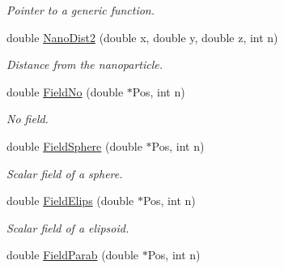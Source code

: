 \begin{DoxyCompactItemize}
\begin{DoxyCompactList}\small\item\em \-Pointer to a generic function. \end{DoxyCompactList}\item 
\hypertarget{classVarData_aa61f01d24c76e8a70a3efe30ea22176b}{double \hyperlink{classVarData_aa61f01d24c76e8a70a3efe30ea22176b}{\-Nano\-Dist2} (double x, double y, double z, int n)}\label{classVarData_aa61f01d24c76e8a70a3efe30ea22176b}

\begin{DoxyCompactList}\small\item\em \-Distance from the nanoparticle. \end{DoxyCompactList}\item 
\hypertarget{classVarData_a735d13f805f242e68213f0fc5e93c1b6}{double \hyperlink{classVarData_a735d13f805f242e68213f0fc5e93c1b6}{\-Field\-No} (double $\ast$\-Pos, int n)}\label{classVarData_a735d13f805f242e68213f0fc5e93c1b6}

\begin{DoxyCompactList}\small\item\em \-No field. \end{DoxyCompactList}\item 
\hypertarget{classVarData_a45e630d9fa10932596d44d946e2800f4}{double \hyperlink{classVarData_a45e630d9fa10932596d44d946e2800f4}{\-Field\-Sphere} (double $\ast$\-Pos, int n)}\label{classVarData_a45e630d9fa10932596d44d946e2800f4}

\begin{DoxyCompactList}\small\item\em \-Scalar field of a sphere. \end{DoxyCompactList}\item 
\hypertarget{classVarData_a6ba3ff45370fe3f774ed6a8f5b022aaa}{double \hyperlink{classVarData_a6ba3ff45370fe3f774ed6a8f5b022aaa}{\-Field\-Elips} (double $\ast$\-Pos, int n)}\label{classVarData_a6ba3ff45370fe3f774ed6a8f5b022aaa}

\begin{DoxyCompactList}\small\item\em \-Scalar field of a elipsoid. \end{DoxyCompactList}\item 
\hypertarget{classVarData_a59948db4efbb953a20515f50b3daacc6}{double \hyperlink{classVarData_a59948db4efbb953a20515f50b3daacc6}{\-Field\-Parab} (double $\ast$\-Pos, int n)}\label{classVarData_a59948db4efbb953a20515f50b3daacc6}


\end{DoxyCompactItemize}
